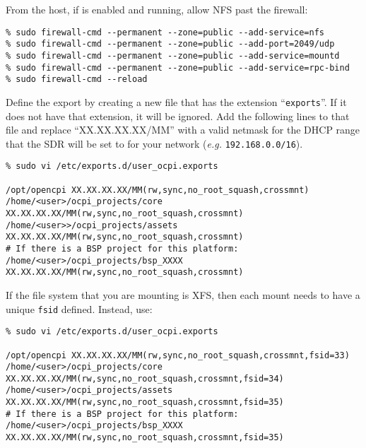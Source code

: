 From the host, if  is enabled and running, allow NFS past the firewall:
\begin{verbatim}
% sudo firewall-cmd --permanent --zone=public --add-service=nfs
% sudo firewall-cmd --permanent --zone=public --add-port=2049/udp
% sudo firewall-cmd --permanent --zone=public --add-service=mountd
% sudo firewall-cmd --permanent --zone=public --add-service=rpc-bind
% sudo firewall-cmd --reload
\end{verbatim}

Define the export by creating a new file that has the extension ``\texttt{exports}''. If it does not have that extension, it will be ignored.  Add the following lines to that file and replace ``XX.XX.XX.XX/MM'' with a valid netmask for the DHCP range that the SDR will be set to for your network (\textit{e.g.} \texttt{192.168.0.0/16}).
\begin{verbatim}
% sudo vi /etc/exports.d/user_ocpi.exports

/opt/opencpi XX.XX.XX.XX/MM(rw,sync,no_root_squash,crossmnt)
/home/<user>/ocpi_projects/core XX.XX.XX.XX/MM(rw,sync,no_root_squash,crossmnt)
/home/<user>>/ocpi_projects/assets XX.XX.XX.XX/MM(rw,sync,no_root_squash,crossmnt)
# If there is a BSP project for this platform:
/home/<user>/ocpi_projects/bsp_XXXX XX.XX.XX.XX/MM(rw,sync,no_root_squash,crossmnt)
\end{verbatim}

If the file system that you are mounting is XFS, then each mount needs to have a unique \texttt{fsid} defined. Instead, use:
\begin{verbatim}
% sudo vi /etc/exports.d/user_ocpi.exports

/opt/opencpi XX.XX.XX.XX/MM(rw,sync,no_root_squash,crossmnt,fsid=33)
/home/<user>/ocpi_projects/core XX.XX.XX.XX/MM(rw,sync,no_root_squash,crossmnt,fsid=34)
/home/<user>/ocpi_projects/assets XX.XX.XX.XX/MM(rw,sync,no_root_squash,crossmnt,fsid=35)
# If there is a BSP project for this platform:
/home/<user>/ocpi_projects/bsp_XXXX XX.XX.XX.XX/MM(rw,sync,no_root_squash,crossmnt,fsid=35)
\end{verbatim}

